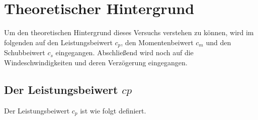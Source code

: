 \section{Theoretischer Hintergrund}
Um den theoretischen Hintergrund dieses Versuchs verstehen zu können, wird im folgenden auf den Leistungsbeiwert $c_{p}$, den Momentenbeiwert $c_{m}$ und den Schubbeiwert $c_{s}$ eingegangen. Abschließend wird noch auf die Windeschwindigkeiten und deren Verzögerung eingegangen.
\subsection{Der Leistungsbeiwert $c{p}$}
Der Leistungsbeiwert $c_{p}$ ist wie folgt definiert.

